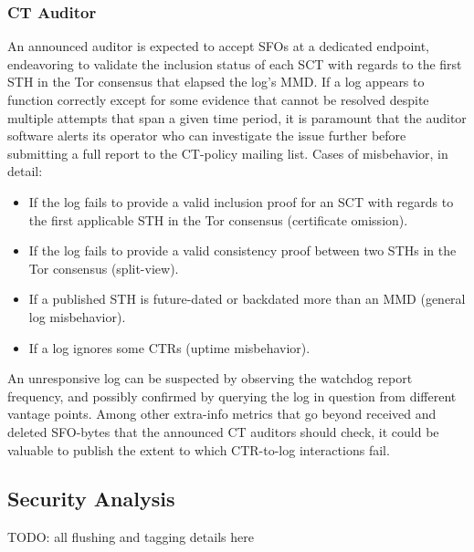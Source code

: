 \subsubsection{CT Auditor} \label{sec:auditor:auditor}
An announced auditor is expected to accept SFOs at a dedicated endpoint,
endeavoring to validate the inclusion status of each SCT with regards to the
first STH in the Tor consensus that elapsed the log's MMD.  If a log appears to
function correctly except for some evidence that cannot be
resolved despite multiple attempts that span a given time period, it is
paramount that the auditor software alerts its operator who can investigate
the issue further before submitting a full report to the CT-policy mailing list.
Cases of misbehavior, in detail:
\begin{itemize}
	\item If the log fails to provide a valid inclusion proof for an SCT with
		regards to the first applicable STH in the Tor consensus
		(certificate omission).
	\item If the log fails to provide a valid consistency proof between two
		STHs in the Tor consensus
		(split-view).
	\item If a published STH is future-dated or backdated more than an MMD
		(general log misbehavior).
	\item If a log ignores some CTRs (uptime misbehavior).
\end{itemize}

An unresponsive log can be suspected by observing the watchdog report frequency,
and possibly confirmed by querying the log in question from different vantage
points.  Among other extra-info metrics that go beyond received and deleted
SFO-bytes that the announced CT auditors should check, it could be valuable to
publish the extent to which CTR-to-log interactions fail.


\subsection{Security Analysis} \label{sec:auditor:analysis}
TODO: all flushing and tagging details here

